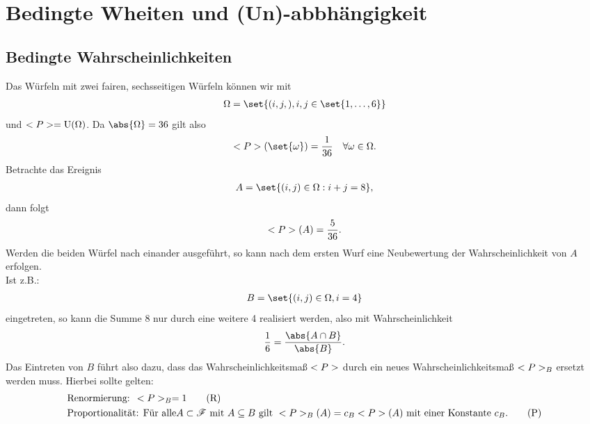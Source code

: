 \chapter[Bedingte Wahrscheinlichkeiten und (Un)-abbhängigkeit]{Bedingte Wheiten und (Un)-abbhängigkeit}

\section{Bedingte Wahrscheinlichkeiten}
\begin{example}
	Das Würfeln mit zwei fairen, sechsseitigen Würfeln können wir mit 
	\begin{align}
		\Omega = \set{(i,j,), i,j \in \set{1,\dots,6}}\notag
	\end{align}
	und $<P> = \operatorname{U}(\Omega)$. Da $\abs{\Omega} = 36$ gilt also
	\begin{align}
		\probp(\set{\omega}) = \frac{1}{36} \quad \forall \omega \in \Omega.\notag
	\end{align}
	Betrachte das Ereignis
	\begin{align}
		A = \set{(i,j) \in \Omega : i + j = 8},\notag
	\end{align}
	dann folgt
	\begin{align}
		<P>(A) = \frac{5}{36}.\notag
	\end{align}
	Werden die beiden Würfel nach einander ausgeführt, so kann nach dem ersten Wurf eine Neubewertung der Wahrscheinlichkeit von $A$ erfolgen.\\
	Ist z.B.:
	\begin{align}
		B = \set{(i,j) \in \Omega, i = 4}\notag
	\end{align}
	eingetreten, so kann die Summe 8 nur durch eine weitere 4 realisiert werden, also mit Wahrscheinlichkeit
	\begin{align}
		\frac{1}{6} = \frac{\abs{A \cap B}}{\abs{B}}.\notag 
	\end{align}
	Das Eintreten von $B$ führt also dazu, dass das Wahrscheinlichkeitsmaß $<P>$ durch ein neues Wahrscheinlichkeitsmaß $<P>_{B}$ ersetzt werden muss. Hierbei sollte gelten:
	\begin{align}
		 &\text{Renormierung: }<P>_{B} = 1\label{Renorm}\tag{R}\\
		 &\text{Proportionalität: Für alle} A \subset \mathscr{F} \text{ mit } A \subseteq B \text{ gilt }
		 <P>_{B}(A) = c_B <P>(A) \text{ mit einer Konstante } c_B.\label{Prop}\tag{P}
    \end{align}
\end{example}

